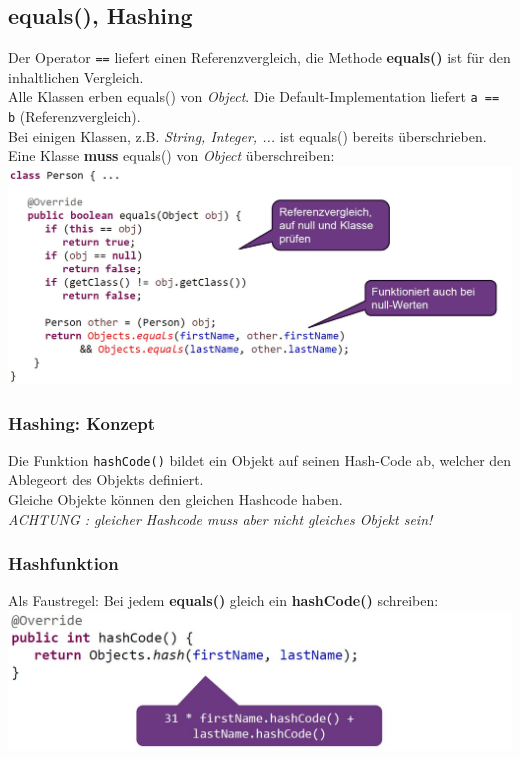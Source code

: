 \subsection{equals(), Hashing}
Der Operator \verb|==| liefert einen Referenzvergleich, die Methode \textbf{equals()} ist für den inhaltlichen Vergleich.\\
Alle Klassen erben equals() von \textit{Object}. Die Default-Implementation liefert \verb|a == b| (Referenzvergleich). \\
Bei einigen Klassen, z.B. \textit{String, Integer, ...} ist equals() bereits überschrieben.\\
Eine Klasse \textbf{muss} equals() von \textit{Object} überschreiben:\\
\includegraphics[width=\linewidth]{pictures/equals-impl.jpg}

\subsubsection{Hashing: Konzept}
Die Funktion \verb|hashCode()| bildet ein Objekt auf seinen Hash-Code ab, welcher den Ablegeort des Objekts definiert.\\
Gleiche Objekte können den gleichen Hashcode haben.\\
\textit{ACHTUNG : gleicher Hashcode muss aber nicht gleiches Objekt sein!}

\subsubsection{Hashfunktion}
Als Faustregel: Bei jedem \textbf{equals()} gleich ein \textbf{hashCode()} schreiben:\\
\includegraphics[width=\linewidth]{pictures/hashcode.jpg}